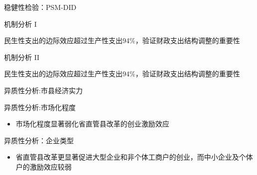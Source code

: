 \documentclass{beamer}
\newcommand{\tightlist}{%
  \setlength{\itemsep}{0pt}\setlength{\parskip}{0pt}}
\begin{document}
\begin{frame}{稳健性检验：PSM-DID}
\label{ux7a33ux5065ux6027ux68c0ux9a8cpsm-did}
\begin{adjustbox}{max totalheight=0.7\textheight} 

\end{adjustbox}

\vspace{-2mm}
\end{frame}

\begin{frame}{机制分析 I}
\label{ux673aux5236ux5206ux6790-i}
\begin{adjustbox}{max width=0.95\textwidth,center}

\end{adjustbox}

\scriptsize

民生性支出的边际效应超过生产性支出94\%，验证财政支出结构调整的重要性
\end{frame}

\begin{frame}{机制分析 II}
\label{ux673aux5236ux5206ux6790-ii}
\begin{adjustbox}{max width=0.95\textwidth,center}

\end{adjustbox}

\scriptsize

民生性支出的边际效应超过生产性支出94\%，验证财政支出结构调整的重要性
\end{frame}

\begin{frame}{异质性分析:市县经济实力}
\label{ux5f02ux8d28ux6027ux5206ux6790ux5e02ux53bfux7ecfux6d4eux5b9eux529b}
\begin{adjustbox}{max width=0.95\textwidth,center}

\end{adjustbox}
\end{frame}

\begin{frame}{异质性分析:市场化程度}
\label{ux5f02ux8d28ux6027ux5206ux6790ux5e02ux573aux5316ux7a0bux5ea6}
\begin{adjustbox}{max width=0.95\textwidth,center}

\end{adjustbox}

\begin{itemize}
\tightlist
\item
  市场化程度显著弱化省直管县改革的创业激励效应
\end{itemize}
\end{frame}

\begin{frame}{异质性分析：企业类型}
\label{ux5f02ux8d28ux6027ux5206ux6790ux4f01ux4e1aux7c7bux578b}
\begin{itemize}
\tightlist
\item
  省直管县改革更显著促进大型企业和非个体工商户的创业，而中小企业及个体户的激励效应较弱
\end{itemize}
\end{frame}
\end{document}

